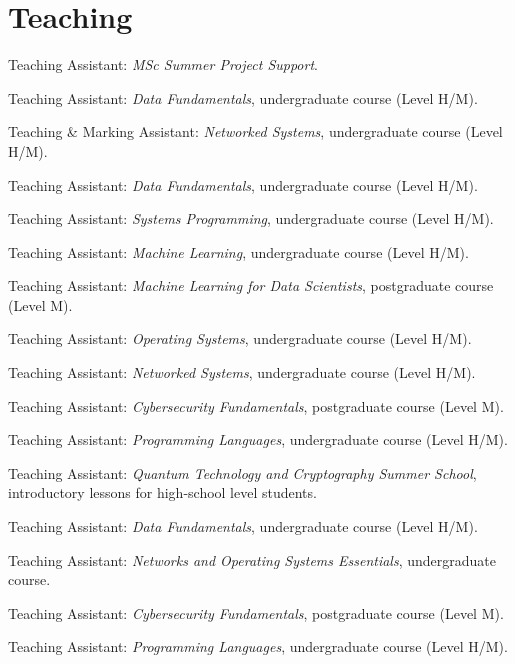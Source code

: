 \section{Teaching}
\begin{cvitemize}[2020--2021]
	\item Teaching Assistant: \emph{MSc Summer Project Support}.
	\item Teaching Assistant: \emph{Data Fundamentals}, undergraduate course (Level H/M).
	\item Teaching \&{} Marking Assistant: \emph{Networked Systems}, undergraduate course (Level H/M).
\end{cvitemize}
\begin{cvitemize}[2019--2020]
	\item Teaching Assistant: \emph{Data Fundamentals}, undergraduate course (Level H/M).
	\item Teaching Assistant: \emph{Systems Programming}, undergraduate course (Level H/M).
	\item Teaching Assistant: \emph{Machine Learning}, undergraduate course (Level H/M).
	\item Teaching Assistant: \emph{Machine Learning for Data Scientists}, postgraduate course (Level M).
	\item Teaching Assistant: \emph{Operating Systems}, undergraduate course (Level H/M).
	\item Teaching Assistant: \emph{Networked Systems}, undergraduate course (Level H/M).
	\item Teaching Assistant: \emph{Cybersecurity Fundamentals}, postgraduate course (Level M).
	\item Teaching Assistant: \emph{Programming Languages}, undergraduate course (Level H/M).
\end{cvitemize}
\begin{cvitemize}[2018--2019]
	\item Teaching Assistant: \emph{Quantum Technology and Cryptography Summer School}, introductory lessons for high-school level students.
	\item Teaching Assistant: \emph{Data Fundamentals}, undergraduate course (Level H/M).
	\item Teaching Assistant: \emph{Networks and Operating Systems Essentials}, undergraduate course.
	\item Teaching Assistant: \emph{Cybersecurity Fundamentals}, postgraduate course (Level M).
	\item Teaching Assistant: \emph{Programming Languages}, undergraduate course (Level H/M).
\end{cvitemize}
